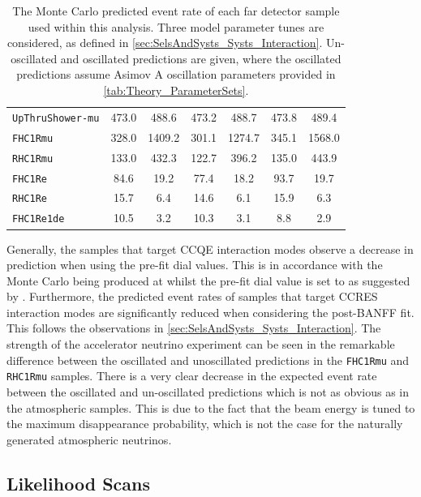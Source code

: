 \begin{table}[ht!]
\begin{tabular}{|l|c|c|c|c|c|c|}
      \texttt{UpThruShower-mu} & 473.0 & 488.6 & 473.2 & 488.7 & 473.8 & 489.4 \\
      \texttt{FHC1Rmu} & 328.0 & 1409.2 & 301.1 & 1274.7 & 345.1 & 1568.0 \\
      \texttt{RHC1Rmu} & 133.0 & 432.3 & 122.7 & 396.2 & 135.0 & 443.9 \\
      \texttt{FHC1Re} & 84.6 & 19.2 & 77.4 & 18.2 & 93.7 & 19.7 \\
      \texttt{RHC1Re} & 15.7 & 6.4 & 14.6 & 6.1 & 15.9 & 6.3 \\
      \texttt{FHC1Re1de} & 10.5 & 3.2 & 10.3 & 3.1 & 8.8 & 2.9 \\
      \hline
      \hline
    \end{tabular}
    \caption{The Monte Carlo predicted event rate of each far detector sample used within this analysis. Three model parameter tunes are considered, as defined in \autoref{sec:SelsAndSysts_Systs_Interaction}. Un-oscillated and oscillated predictions are given, where the oscillated predictions assume Asimov A oscillation parameters provided in \autoref{tab:Theory_ParameterSets}.}
    \label{tab:OscillationAnalysis_MCPred}
\end{table}

Generally, the samples that target CCQE interaction modes observe a decrease in prediction when using the pre-fit dial values. This is in accordance with the Monte Carlo being produced at  \cite{Aguilar_Arevalo_2010} whilst the pre-fit dial value is set to  as suggested by \cite{t2k_tn_344}. Furthermore, the predicted event rates of samples that target CCRES interaction modes are significantly reduced when considering the post-BANFF fit. This follows the observations in \autoref{sec:SelsAndSysts_Systs_Interaction}. The strength of the accelerator neutrino experiment can be seen in the remarkable difference between the oscillated and unoscillated predictions in the \texttt{FHC1Rmu} and \texttt{RHC1Rmu} samples. There is a very clear decrease in the expected event rate between the oscillated and un-oscillated predictions which is not as obvious as in the atmospheric samples. This is due to the fact that the beam energy is tuned to the maximum disappearance probability, which is not the case for the naturally generated atmospheric neutrinos.

\subsection{Likelihood Scans}
\label{sec:OscillationAnalysis_LLHScans}

